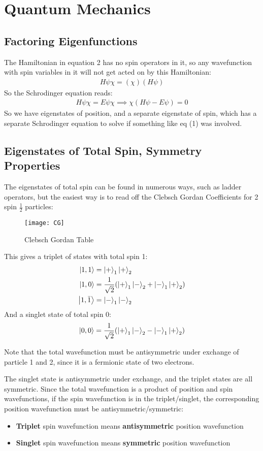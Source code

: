 \documentclass[12pt]{article}
\theoremstyle{plain}
\theoremstyle{definition}
\begin{document}
\newpage
\section{Quantum Mechanics}
\subsection{Factoring Eigenfunctions}
The Hamiltonian in equation 2 has no spin operators in it, so any wavefunction with spin variables in it will not get acted on by this Hamiltonian:
\begin{align*}
  \boxed{H\psi\chi=(\chi)(H\psi)}
\end{align*}
So the Schrodinger equation reads:
\begin{align*}
  H\psi\chi=E\psi\chi\implies \chi(H\psi-E\psi)=0
\end{align*}
So we have eigenstates of position, and a separate eigenstate of spin, which has a separate Schrodinger equation to solve if something like eq (1) was involved.
\subsection{Eigenstates of Total Spin, Symmetry Properties}
The eigenstates of total spin can be found in numerous ways, such as ladder operators, but the easiest way is to read off the Clebsch Gordan Coefficients for 2 spin $\frac12$ particles:
\begin{figure}[H]
  \centering
  \texttt{[image: CG]}
  \caption{Clebsch Gordan Table}
\end{figure}
This gives a triplet of states with total spin 1:
\begin{align*}
  \ket{1, 1}&=\ket{+}_1\ket{+}_2\\
  \ket{1, 0}&=\frac{1}{\sqrt{2}}\qty(\ket{+}_1\ket{-}_2+\ket{-}_1\ket{+}_2)\\
  \ket{1,\bar{1}}&=\ket{-}_1\ket{-}_2
\end{align*}
And a singlet state of total spin 0:
\begin{align*}
  \ket{0,0}=\frac{1}{\sqrt{2}}\qty(\ket{+}_1\ket{-}_2-\ket{-}_1\ket{+}_2)
\end{align*}

Note that the total wavefunction must be antisymmetric under exchange of particle 1 and 2, since it is a fermionic state of two electrons.

The singlet state is antisymmetric under exchange, and the triplet states are all symmetric. Since the total wavefunction is a product of position and spin wavefunctions, if the spin wavefunction is in the triplet/singlet, the corresponding position wavefunction must be antisymmetric/symmetric:
\begin{itemize}
\item \textbf{Triplet} spin wavefunction means
  \textbf{antisymmetric} position wavefunction
\item \textbf{Singlet} spin wavefunction means
  \textbf{symmetric} position wavefunction
\end{itemize}
\end{document}
